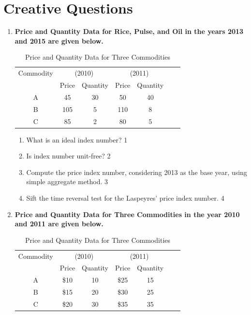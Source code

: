 \documentclass[a4paper,oneside, margin=1.4in]{book}
\begin{document}
\section{Creative Questions}
  \begin{enumerate}
  
 \item
  \textbf{Price and Quantity Data for Rice, Pulse, and Oil in the years 2013 and 2015 are given below.}
  
  \begin{table}[h]
\centering
\begin{tabular}{ccccccc}
\hline
Commodity & \multicolumn{2}{c}{(2010)} & \multicolumn{2}{c}{(2011)}  \\
& Price & Quantity & Price & Quantity\\
\hline
A & 45 & 30 & 50 & 40  \\
B & 105 & 5 & 110 & 8  \\
C & 85 & 2 & 80 & 5 \\
\hline
\end{tabular}
\caption{Price and Quantity Data for Three Commodities}
\label{tab:price_quantity}
\end{table}

  
  \begin{enumerate}
    \item
	What is an ideal index number? \hfill 1
    \item
	Is index number unit-free? \hfill 2
    \item  
	Compute the price index number, considering 2013 as the base year, using simple aggregate method. \hfill 3
    \item
	Sift the time reversal test for the Laspeyres' price index number.  \hfill 4
  \end{enumerate}  
  
 \item
 
  \textbf{Price and Quantity Data for Three Commodities in the year 2010 and 2011 are given below.}
  
  \begin{table}[h]
\centering
\begin{tabular}{ccccccc}
\hline
Commodity & \multicolumn{2}{c}{(2010)} & \multicolumn{2}{c}{(2011)}  \\
& Price & Quantity & Price & Quantity\\
\hline
A & \$10 & 10 & \$25 & 15  \\
B & \$15 & 20 & \$30 & 25  \\
C & \$20 & 30 & \$35 & 35 \\
\hline
\end{tabular}
\caption{Price and Quantity Data for Three Commodities}
\label{tab:price_quantity}
\end{table}


\end{enumerate}
\end{document}
